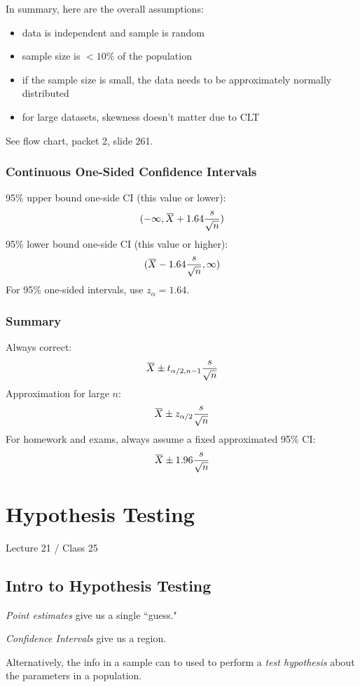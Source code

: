 \documentclass[11pt, oneside]{article}   	%
\newcommand{\overbar}[1]{\mkern 1.5mu\overline{\mkern-1.5mu#1\mkern-1.5mu}\mkern 1.5mu}
\begin{document}
In summary, here are the overall assumptions:
\begin{itemize}
\item{data is independent and sample is random}
\item{sample size is $< 10\%$ of the population}
\item{if the sample size is small, the data needs to be approximately normally distributed}
\item{for large datasets, skewness doesn't matter due to CLT}
\end{itemize}

See flow chart, packet 2, slide 261.

\subsubsection{Continuous One-Sided Confidence Intervals}

95\% upper bound one-side CI (this value or lower):
\[
(-\infty, \overbar{X} + 1.64 \frac{s} {\sqrt{n}} )
\]
95\% lower bound one-side CI (this value or higher):
\[
(\overbar{X} - 1.64 \frac{s} {\sqrt{n}} , \infty)
\]
For 95\% one-sided intervals, use $z_{\alpha} = 1.64$.

\subsubsection{Summary}
Always correct:
\[
\overbar{X} \pm t_{\alpha / 2, n-1} \frac{s} {\sqrt{n}}
\]
Approximation for large $n$:
\[
\overbar{X} \pm z_{\alpha / 2} \frac{s} {\sqrt{n}}
\]
For homework and exams, always assume a fixed approximated 95\% CI:
\[
\overbar{X} \pm 1.96 \frac{s} {\sqrt{n}}
\]

\section{Hypothesis Testing}

Lecture 21 / Class 25
\subsection{Intro to Hypothesis Testing}

\textit{Point estimates} give us a single ``guess."

\textit{Confidence Intervals} give us a region.

Alternatively, the info in a sample can to used to perform a \textit{test hypothesis} about the parameters in a population.
\end{document}
